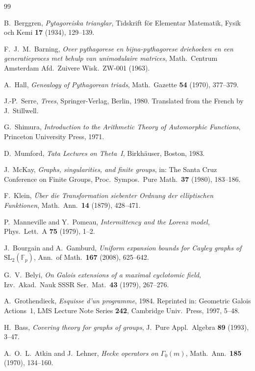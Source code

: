 \documentclass[12pt]{amsart}
\theoremstyle{definition}
\theoremstyle{remark}
\newcommand{\SL}{\mathrm{SL}}
\newcommand{\Fp}{\mathbb{F}_p}
\begin{document}
\begin{thebibliography}{99}

B.~Berggren,
\emph{Pytagoreiska trianglar},
Tidskrift f\"or Elementar Matematik, Fysik och Kemi \textbf{17} (1934), 129--139.

F.~J.~M.~Barning,
\emph{Over pythagorese en bijna-pythagorese driehoeken en een
generatieproces met behulp van unimodulaire matrices},
Math.\ Centrum Amsterdam Afd.\ Zuivere Wisk.\ ZW-001 (1963).

A.~Hall,
\emph{Genealogy of Pythagorean triads},
Math.\ Gazette \textbf{54} (1970), 377--379.

J.-P.~Serre,
\emph{Trees},
Springer-Verlag, Berlin, 1980.
Translated from the French by J.~Stillwell.

G.~Shimura,
\emph{Introduction to the Arithmetic Theory of Automorphic Functions},
Princeton University Press, 1971.

D.~Mumford,
\emph{Tata Lectures on Theta~I},
Birkh\"auser, Boston, 1983.

J.~McKay,
\emph{Graphs, singularities, and finite groups},
in: The Santa Cruz Conference on Finite Groups,
Proc.\ Sympos.\ Pure Math.\ \textbf{37} (1980), 183--186.

F.~Klein,
\emph{\"Uber die Transformation siebenter Ordnung der elliptischen
Funktionen},
Math.\ Ann.\ \textbf{14} (1879), 428--471.

P.~Manneville and Y.~Pomeau,
\emph{Intermittency and the Lorenz model},
Phys.\ Lett.\ A \textbf{75} (1979), 1--2.

J.~Bourgain and A.~Gamburd,
\emph{Uniform expansion bounds for Cayley graphs of $\SL_2(\Fp)$},
Ann.\ of Math.\ \textbf{167} (2008), 625--642.

G.~V.~Belyi,
\emph{On Galois extensions of a maximal cyclotomic field},
Izv.\ Akad.\ Nauk SSSR Ser.\ Mat.\ \textbf{43} (1979), 267--276.

A.~Grothendieck,
\emph{Esquisse d'un programme},
1984.
Reprinted in: Geometric Galois Actions~1, LMS Lecture Note Series \textbf{242},
Cambridge Univ.\ Press, 1997, 5--48.

H.~Bass,
\emph{Covering theory for graphs of groups},
J.\ Pure Appl.\ Algebra \textbf{89} (1993), 3--47.

A.~O.~L.~Atkin and J.~Lehner,
\emph{Hecke operators on $\Gamma_0(m)$},
Math.\ Ann.\ \textbf{185} (1970), 134--160.

\end{thebibliography}
\end{document}
